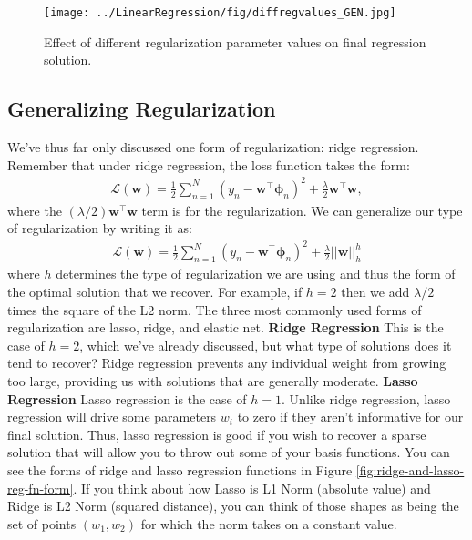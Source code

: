 \begin{figure}
    \centering
    \texttt{[image: ../LinearRegression/fig/diffregvalues\_GEN.jpg]}
    \caption{Effect of different regularization parameter values on final regression solution.}
    \label{fig:ridge-reg-diff-values}
\end{figure}

\subsection{Generalizing Regularization}
We've thus far only discussed one form of regularization: ridge regression. Remember that under ridge regression, the loss function takes the form:
\begin{align*}
    \mathcal{L}(\textbf{w}) = \frac{1}{2} \sum_{n=1}^{N} (y_{n} - \textbf{w}^\top\boldsymbol{\phi}_{n})^2 + \frac{\lambda}{2}\textbf{w}^{\top}\textbf{w},
\end{align*}
%
where the $(\lambda/2)\textbf{w}^\top\textbf{w}$ term is for the regularization. We can generalize our type of regularization by writing it as:
\begin{align*}
    \mathcal{L}(\textbf{w}) = \frac{1}{2} \sum_{n=1}^{N} (y_{n} - \textbf{w}^\top\boldsymbol{\phi}_{n})^2 + \frac{\lambda}{2}\big|\big|\textbf{w}\big|\big|_h^{h}
\end{align*}
where $h$ determines the type of regularization we are using and thus the form of the optimal solution that we recover. For example, if $h=2$ then we add $\lambda/2$ times the square of the L2 norm.
The three most commonly used forms of regularization are lasso, ridge, and elastic net. \newline \newline
\textbf{Ridge Regression} \newline
This is the case of $h = 2$, which we've already discussed, but what type of solutions does it tend to recover? Ridge regression prevents any individual weight from growing too large, providing us with solutions that are generally moderate. \newline \newline
\textbf{Lasso Regression} \newline
Lasso regression is the case of $h = 1$. Unlike ridge regression, lasso regression will drive some parameters $w_{i}$ to zero if they aren't informative for our final solution. Thus, lasso regression is good if you wish to recover a sparse solution that will allow you to throw out some of your basis functions. You can see the forms of ridge and lasso regression functions in Figure \ref{fig:ridge-and-lasso-reg-fn-form}.
If you think about how Lasso is L1 Norm (absolute value) and Ridge is L2 Norm (squared distance), you can think of those shapes as being the set of points $(w_1,w_2)$ for which the norm takes on a constant value.
%
\newline
\newline

